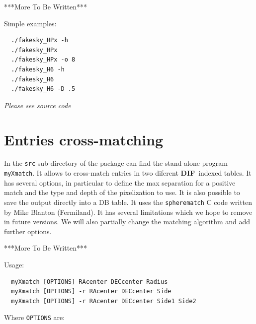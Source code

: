 \documentclass[10pt,titlepage]{article}
\newcommand{\dif}{\textbf{\small DIF}}
\begin{document}
\bigskip
***More To Be Written***

\noindent Simple examples:
\begin{verbatim}
  ./fakesky_HPx -h
  ./fakesky_HPx
  ./fakesky_HPx -o 8
  ./fakesky_H6 -h
  ./fakesky_H6
  ./fakesky_H6 -D .5
\end{verbatim}
%
\emph{Please see source code}

%
\section{Entries cross-matching}
\label{sec:xmatch}
In the \verb|src| sub-directory of the package can find the stand-alone
program \verb|myXmatch|. It allows to cross-match entries in two diferent \dif\
indexed tables. It has several options, in particular to define the max
separation for a positive match and the type and depth of the pixelization to
use. It is also possible to save the output directly into a DB table.
It uses the \verb|spherematch| C code written by Mike Blanton (Fermiland).
It has several limitations which we hope to remove in future versions.
We will also partially change the matching algorithm and add further options.

\bigskip
***More To Be Written***

\noindent Usage:
\begin{verbatim}
  myXmatch [OPTIONS] RAcenter DECcenter Radius
  myXmatch [OPTIONS] -r RAcenter DECcenter Side
  myXmatch [OPTIONS] -r RAcenter DECcenter Side1 Side2
\end{verbatim}

\noindent Where \verb|OPTIONS| are:
\end{document}
